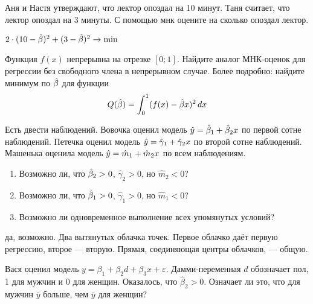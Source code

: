 \documentclass[pdftex,11pt,openany]{book}\usepackage[]{graphicx}\usepackage[]{color}
\begin{document}
\begin{problem}
 Аня и Настя утверждают, что лектор опоздал на 10 минут. Таня считает, что лектор опоздал на 3 минуты. С помощью мнк оцените на сколько опоздал лектор. 
\end{problem}
\begin{solution}
 $2\cdot (10-\hat{\beta})^2+(3-\hat{\beta})^2\rightarrow\min$ 
\end{solution}


\begin{problem}
 Функция $f(x)$ непрерывна на отрезке $[0;1]$. Найдите аналог МНК-оценок для регрессии без свободного члена в непрерывном случае. Более подробно: найдите минимум по $\hat{\beta}$ для функции
\begin{equation}
Q(\hat{\beta})= \int_0^1 (f(x)-\hat{\beta} x)^2\,dx
\end{equation}
\end{problem}

\begin{solution}
\end{solution}


\begin{problem}
 Есть двести наблюдений. Вовочка оценил модель $\hat{y}=\hat{\beta}_1+\hat{\beta}_2 x$ по первой сотне наблюдений. Петечка оценил модель $\hat{y}=\hat{\gamma}_1+\hat{\gamma}_2 x$ по второй сотне наблюдений. Машенька оценила модель $\hat{y}=\hat{m}_1+\hat{m}_2 x$ по всем наблюдениям.
\begin{enumerate}
\item Возможно ли, что $\hat{\beta}_2>0$, $\hat{\gamma}_2>0$, но $\hat{m}_2<0$?
\item Возможно ли, что $\hat{\beta}_1>0$, $\hat{\gamma}_1>0$, но $\hat{m}_1<0$?
\item Возможно ли одновременное выполнение всех упомянутых условий?
\end{enumerate}
\end{problem}

\begin{solution}
да, возможно. Два вытянутых облачка точек. Первое облачко даёт первую регрессию, второе --- вторую. Прямая, соединяющая центры облачков, --- общую.
\end{solution}



\begin{problem}
 Вася оценил модель $y=\beta_1+\beta_2 d+\beta_3 x+\varepsilon$. Дамми-переменная $d$ обозначает пол, 1 для мужчин и 0 для женщин. Оказалось, что $\hat{\beta}_2>0$. Означает ли это, что для мужчин $\bar{y}$ больше, чем $\bar{y}$ для женщин?
\end{problem}
\end{document}
